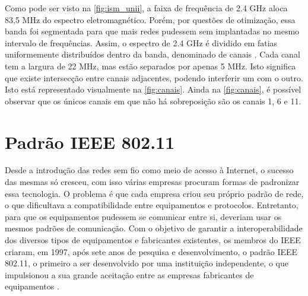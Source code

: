 Como pode ser visto na \autoref{fig:ism_unii}, a faixa de frequência de 2.4 GHz aloca 83,5 MHz do espectro eletromagnético. Porém, por questões de otimização, essa banda foi segmentada para que mais redes pudessem sem implantadas no mesmo intervalo de frequências.  Assim, o espectro de 2.4 GHz é dividido em fatias uniformemente distribuídos dentro da banda, denominado de canais \cite{flickenger2008}. Cada canal tem a largura de 22 MHz, mas estão separados por apenas 5 MHz. Isto significa que existe intersecção entre canais adjacentes, podendo interferir um com o outro. Isto está representado visualmente na \autoref{fig:canais}. Ainda na \autoref{fig:canais}, é possível observar que os únicos canais em que não há sobreposição são os canais 1, 6 e 11.

\begin{figure}[H]
	\centering
\end{figure}

\section{Padrão IEEE 802.11}
\label{sub:padrao-ieee-802-11}

Desde a introdução das redes sem fio como meio de acesso à Internet, o sucesso das mesmas só cresceu, com isso várias empresas procuram formas de padronizar essa tecnologia. O problema é que cada empresa criou seu próprio padrão de rede, o que dificultava a compatibilidade entre equipamentos e protocolos.
Entretanto, para que os equipamentos pudessem se comunicar entre si, deveriam usar os mesmos padrões de comunicação. Com o objetivo de garantir a interoperabilidade dos diversos tipos de equipamentos e fabricantes existentes, os membros do IEEE criaram, em 1997, após sete anos de pesquisa e desenvolvimento, o padrão IEEE 802.11, o primeiro a ser desenvolvido por uma instituição independente, o que impulsionou a sua grande aceitação entre as empresas fabricantes de equipamentos \cite{fluminense2010}.

